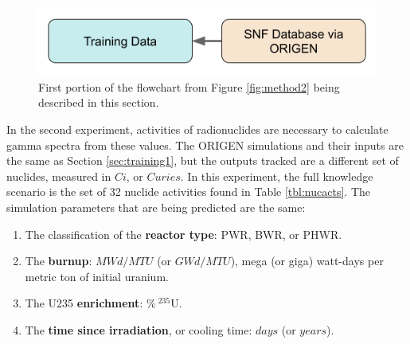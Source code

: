 
\begin{figure}[H]
  \centering
  \includegraphics[width=0.7\linewidth]{./chapters/exp2/methodology2_1.png}
  \caption[First portion of the flowchart from Figure \ref{fig:method2}]
          {First portion of the flowchart from Figure \ref{fig:method2} being 
           described in this section.}
\end{figure}

In the second experiment, activities of radionuclides are necessary to
calculate gamma spectra from these values. The \gls{ORIGEN} simulations and
their inputs are the same as Section \ref{sec:training1}, but the outputs
tracked are a different set of nuclides, measured in $Ci$, or $Curies$.  In
this experiment, the full knowledge scenario is the set of 32 nuclide
activities found in Table \ref{tbl:nucacts}.  The simulation parameters that
are being predicted are the same:
\begin{enumerate}
  \item The classification of the \textbf{reactor type}: \gls{PWR}, \gls{BWR}, 
        or \gls{PHWR}.
  \item The \textbf{burnup}: $MWd/MTU$ (or $GWd/MTU$), mega (or giga) 
        watt-days per metric ton of initial uranium.
  \item The \gls{U235} \textbf{enrichment}: $\%\:{}^{235}\text{U}$. 
  \item The \textbf{time since irradiation}, or cooling time: $days$ (or $years$).
\end{enumerate}

